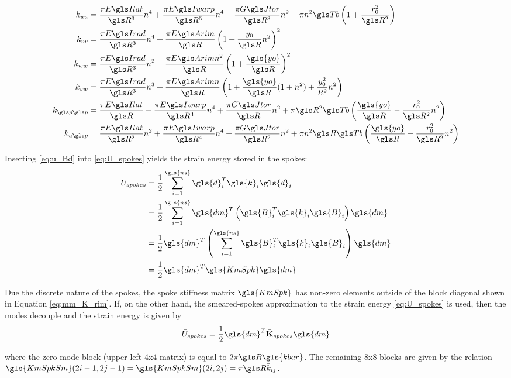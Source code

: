 \documentclass[\rootdir/thesis.tex]{subfiles}
\begin{document}
\begin{align*}
k_{uu} &= \frac{\pi \EIl}{\R^3}n^4 + \frac{\pi \EIw}{\R^5}n^4 + \frac{\pi \GJ}{\R^3}n^2 - \pi n^2 \Tb\left(1 + \frac{r_0^2}{\R^2}\right)\\
k_{vv} &= \frac{\pi \EIr}{\R^3}n^4 + \frac{\pi \EA}{\R}\left(1 + \frac{y_0}{\R}n^2 \right)^2\\
k_{ww} &= \frac{\pi \EIr}{\R^3}n^2 + \frac{\pi \EA n^2}{\R}\left(1 + \frac{\gls{yo}}{\R} \right)^2\\
k_{vw} &= \frac{\pi \EIr}{\R^3}n^3 + \frac{\pi \EA n}{\R}\left(1 + \frac{\gls{yo}}{\R}(1+n^2) + \frac{y_0^2}{R^2}n^2\right)\\
k_{\p\p} &= \frac{\pi \EIl}{\R} + \frac{\pi \EIw}{\R^3}n^4 + \frac{\pi \GJ}{\R}n^2 + \pi \R^2\Tb\left(\frac{\gls{yo}}{\R} - \frac{r_0^2}{\R^2}n^2\right)\\
k_{u\p} &= \frac{\pi \EIl}{\R^2}n^2 + \frac{\pi \EIw}{\R^4}n^4 + \frac{\pi \GJ}{\R^2}n^2 + \pi n^2 \R \Tb\left(\frac{\gls{yo}}{\R} - \frac{r_0^2}{\R^2}n^2\right)
\end{align*}

Inserting \eqref{eq:u_Bd} into \eqref{eq:U_spokes} yields the strain energy stored in the spokes:
\begin{align}
\label{eq:mm_U_spokes}
\begin{split}
U_{spokes} &= \frac{1}{2} \sum_{i=1}^{\gls{ns}} \gls{d}_i^T \gls{k}_i \gls{d}_i\\
&= \frac{1}{2} \sum_{i=1}^{\gls{ns}} \gls{dm}^T \left(\gls{B}_i^T \gls{k}_i \gls{B}_i \right)\gls{dm}\\
&= \frac{1}{2} \gls{dm}^T \left(\sum_{i=1}^{\gls{ns}} \gls{B}_i^T \gls{k}_i \gls{B}_i \right) \gls{dm}\\
&= \frac{1}{2} \gls{dm}^T \gls{KmSpk} \gls{dm}
\end{split}
\end{align}

Due the discrete nature of the spokes, the spoke stiffness matrix $\gls{KmSpk}$ has non-zero elements outside of the block diagonal shown in Equation \eqref{eq:mm_K_rim}. If, on the other hand, the smeared-spokes approximation to the strain energy \eqref{eq:U_spokes} is used, then the modes decouple and the strain energy is given by
\begin{equation}
\label{eq:U_spokes_smeared}
\bar{U}_{spokes} = \frac{1}{2} \gls{dm}^T \bar{\mathbf{K}}_{spokes} \gls{dm}
\end{equation}

where the zero-mode block (upper-left 4x4 matrix) is equal to $2\pi \R\gls{kbar}$. The remaining 8x8 blocks are given by the relation $\gls{KmSpkSm}(2i-1, 2j-1) = \gls{KmSpkSm}(2i, 2j) = \pi \R \bar{k}_{ij}$.
\end{document}
